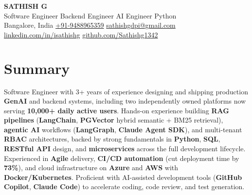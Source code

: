 \documentclass[10pt,letterpaper]{article}
\newcommand{\weblink}[2]{\href{#1}{#2}}
\begin{document}
\begin{center}
{\LARGE \textbf{SATHISH G}}\\[2pt]
Software Engineer \textbar{} Backend Engineer \textbar{} AI Engineer \textbar{} Python\\[2pt]
Bangalore, India \textbar{} \weblink{tel:+919488965359}{+91-9488965359} \textbar{} \weblink{mailto:sathishgdpi@gmail.com}{sathishgdpi@gmail.com} \textbar{} \weblink{https://linkedin.com/in/isathishg}{linkedin.com/in/isathishg} \textbar{} \weblink{https://github.com/Sathishg1342}{github.com/Sathishg1342}
\end{center}

\section*{Summary}
Software Engineer with 3+ years of experience designing and shipping production \textbf{GenAI} and backend systems, including two independently owned platforms now serving \textbf{10,000+ daily active users}. Hands-on experience building \textbf{RAG pipelines} (\textbf{LangChain}, \textbf{PGVector} hybrid semantic + BM25 retrieval), \textbf{agentic AI} workflows (\textbf{LangGraph}, \textbf{Claude Agent SDK}), and multi-tenant \textbf{RBAC} architectures, backed by strong fundamentals in \textbf{Python}, \textbf{SQL}, \textbf{RESTful API} design, and \textbf{microservices} across the full development lifecycle. Experienced in \textbf{Agile} delivery, \textbf{CI/CD automation} (cut deployment time by \textbf{73\%}), and cloud infrastructure on \textbf{Azure} and \textbf{AWS} with \textbf{Docker/Kubernetes}. Proficient with AI-assisted development tools (\textbf{GitHub Copilot}, \textbf{Claude Code}) to accelerate coding, code review, and test generation.

\end{document}
